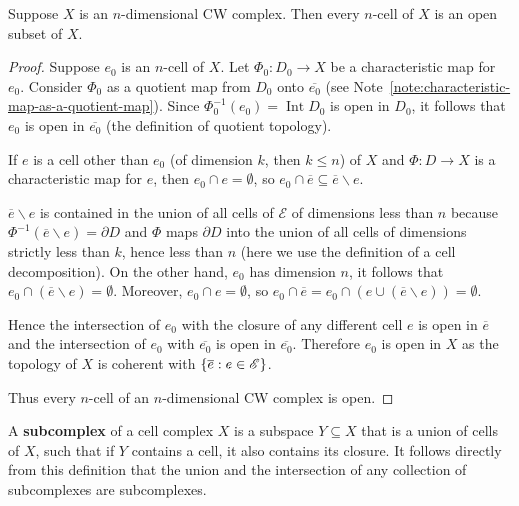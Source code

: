 \begin{prop}{5.5}
	Suppose \( X \) is an \( n \)-dimensional CW complex. Then every \( n \)-cell of \( X \) is an open subset of \( X \).
\end{prop}

\begin{proof}
	Suppose \( e_{0} \) is an \( n \)-cell of \( X \). Let \( \Phi_{0}: D_{0} \to X \) be a characteristic map for \( e_{0} \). Consider \( \Phi_{0} \) as a quotient map from \( D_{0} \) onto \( \overline{e_{0}} \) (see Note~\ref{note:characteristic-map-as-a-quotient-map}). Since \( \Phi_{0}^{-1}(e_{0}) = \operatorname{Int} D_{0} \) is open in \( D_{0} \), it follows that \( e_{0} \) is open in \( \overline{e_{0}} \) (the definition of quotient topology).

	If \( e \) is a cell other than \( e_{0} \) (of dimension \( k \), then \( k \leq n \)) of \( X \) and \( \Phi: D \to X \) is a characteristic map for \( e \), then \( e_{0} \cap e = \emptyset \), so \( e_{0} \cap \overline{e} \subseteq \overline{e} \smallsetminus e \).

	\( \overline{e}\smallsetminus e \) is contained in the union of all cells of \( \mathscr{E} \) of dimensions less than \( n \) because \( \Phi^{-1}(\overline{e}\smallsetminus e) = \partial D \) and \( \Phi \) maps \( \partial D \) into the union of all cells of dimensions strictly less than \( k \), hence less than \( n \) (here we use the definition of a cell decomposition). On the other hand, \( e_{0} \) has dimension \( n \), it follows that \( e_{0} \cap (\overline{e}\smallsetminus e) = \emptyset \). Moreover, \( e_{0} \cap e = \emptyset \), so \( e_{0} \cap \overline{e} = e_{0} \cap (e \cup (\overline{e}\smallsetminus e)) = \emptyset \).

	Hence the intersection of \( e_{0} \) with the closure of any different cell \( e \) is open in \( \overline{e} \) and the intersection of \( e_{0} \) with \( \overline{e_{0}} \) is open in \( \overline{e_{0}} \). Therefore \( e_{0} \) is open in \( X \) as the topology of \( X \) is coherent with \( \left\{{ \overline{e}: e \in \mathscr{E} }\right\} \).

    Thus every \( n \)-cell of an \( n \)-dimensional CW complex is open.
\end{proof}

A \textbf{subcomplex} of a cell complex \( X \) is a subspace \( Y \subseteq X \) that is a union of cells of \( X \), such that if \( Y \) contains a cell, it also contains its closure. It follows directly from this definition that the union and the intersection of any collection of subcomplexes are subcomplexes.

